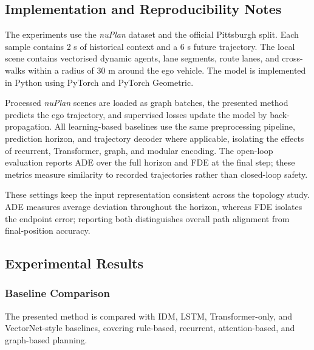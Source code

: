 \subsection{Implementation and Reproducibility Notes}
\label{subsec:magnet_implementation}

The experiments use the \textit{nuPlan} dataset and the official Pittsburgh split. Each sample contains 2 s of historical context and a 6 s future trajectory. The local scene contains vectorised dynamic agents, lane segments, route lanes, and cross-walks within a radius of 30 m around the ego vehicle. The model is implemented in Python using PyTorch and PyTorch Geometric. 

Processed \textit{nuPlan} scenes are loaded as graph batches, the presented method predicts the ego trajectory, and supervised losses update the model by back-propagation. All learning-based baselines use the same preprocessing pipeline, prediction horizon, and trajectory decoder where applicable, isolating the effects of recurrent, Transformer, graph, and modular encoding. The open-loop evaluation reports ADE over the full horizon and FDE at the final step; these metrics measure similarity to recorded trajectories rather than closed-loop safety.

These settings keep the input representation consistent across the topology study. ADE measures average deviation throughout the horizon, whereas FDE isolates the endpoint error; reporting both distinguishes overall path alignment from final-position accuracy.

\subsection{Experimental Results}
\label{subsec:magnet_results}

\subsubsection{Baseline Comparison}
\label{subsubsec:magnet_baseline_results}

The presented method is compared with IDM, LSTM, Transformer-only, and VectorNet-style baselines, covering rule-based, recurrent, attention-based, and graph-based planning.

